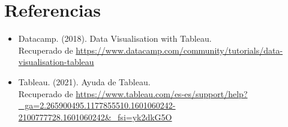 \documentclass[12pt,letterpaper]{article}
\begin{document}
    \section{Referencias}
    \begin{itemize}
        \item Datacamp. (2018). Data Visualisation with Tableau.\\
        Recuperado de \textcolor{azul}{\url{https://www.datacamp.com/community/tutorials/data-visualisation-tableau}}
        \item Tableau. (2021). Ayuda de Tableau.\\
        Recuperado de \textcolor{azul}{\url{https://www.tableau.com/es-es/support/help?_ga=2.265900495.1177855510.1601060242-2100777728.1601060242&_fsi=yk2dkG5O}}
    \end{itemize}
\end{document}
